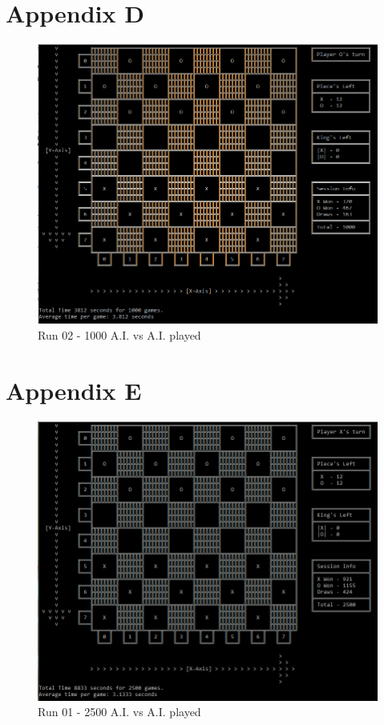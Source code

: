\documentclass[10pt, a4paper]{article}
\begin{document}
\newpage
\section{Appendix D}

\begin{figure}[H]
	\centering
	\includegraphics[scale=0.8]{RunTwo1000}
	\caption{Run 02 - 1000 A.I. vs A.I. played}
\end{figure}


\section{Appendix E}

\begin{figure}[H]
	\centering	
	\includegraphics[scale=0.8]{RunOne2500}
	\caption{Run 01 - 2500 A.I. vs A.I. played}		
\end{figure}
\end{document}
